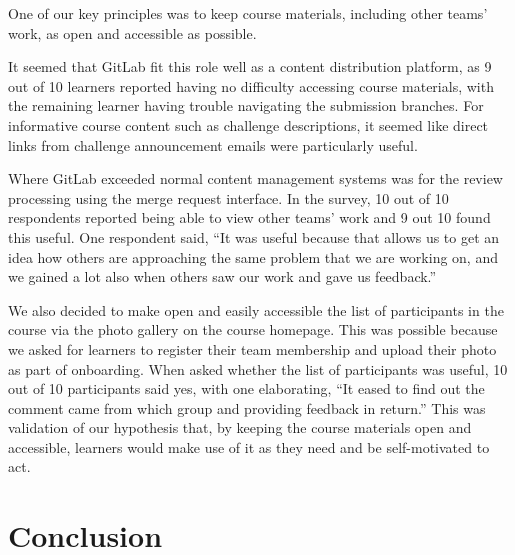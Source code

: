 \documentclass[12pt,twoside]{mitthesis}
\newcommand{\review}[1]{{\color{mygreen} #1}}
\begin{document}
\review{One of our key principles was to keep course materials, including other teams' work, as open and accessible as possible. 

It seemed that GitLab fit this role well as a content distribution platform, as 9 out of 10 learners reported having no difficulty accessing course materials, with the remaining learner having trouble navigating the submission branches. For informative course content such as challenge descriptions, it seemed like direct links from challenge announcement emails were particularly useful.

Where GitLab exceeded normal content management systems was for the review processing using the merge request interface. In the survey, 10 out of 10 respondents reported being able to view other teams' work and 9 out 10 found this useful. One respondent said, ``It was useful because that allows us to get an idea how others are approaching the same problem that we are working on, and we gained a lot also when others saw our work and gave us feedback.'' 

We also decided to make open and easily accessible the list of participants in the course via the photo gallery on the course homepage. This was possible because we asked for learners to register their team membership and upload their photo as part of onboarding. When asked whether the list of participants was useful, 10 out of 10 participants said yes, with one elaborating, ``It eased to find out the comment came from which group and providing feedback in return.'' This was validation of our hypothesis that, by keeping the course materials open and accessible, learners would make use of it as they need and be self-motivated to act.}

\chapter{Conclusion}
\end{document}
